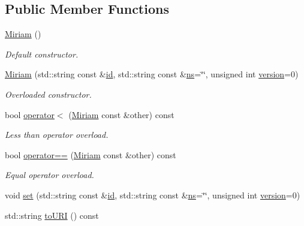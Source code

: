 \subsection*{Public Member Functions}
\begin{DoxyCompactItemize}
\item 
\hyperlink{classunisys_1_1Miriam_af805ea42b5093cb6f11f9c0e62bd448e}{Miriam} ()
\begin{DoxyCompactList}\small\item\em Default constructor. \end{DoxyCompactList}\item 
\hyperlink{classunisys_1_1Miriam_a1b881748690196866d48d3f221d20364}{Miriam} (std\-::string const \&\hyperlink{classunisys_1_1Miriam_a0f6c60a2c904d9e5b28653464f5867f1}{id}, std\-::string const \&\hyperlink{classunisys_1_1Miriam_a03b5f4f8523b5910504f6587fbd9cb0a}{ns}=\char`\"{}\char`\"{}, unsigned int \hyperlink{classunisys_1_1Miriam_a5dcb23fc55cc7643245087a941321a72}{version}=0)
\begin{DoxyCompactList}\small\item\em Overloaded constructor. \end{DoxyCompactList}\item 
bool \hyperlink{classunisys_1_1Miriam_a9c3ed7115b580c3f242b256a2e2a50b9}{operator$<$} (\hyperlink{classunisys_1_1Miriam}{Miriam} const \&other) const 
\begin{DoxyCompactList}\small\item\em Less than operator overload. \end{DoxyCompactList}\item 
bool \hyperlink{classunisys_1_1Miriam_af67d441a13cbe7ecc1d8898254f1709e}{operator==} (\hyperlink{classunisys_1_1Miriam}{Miriam} const \&other) const 
\begin{DoxyCompactList}\small\item\em Equal operator overload. \end{DoxyCompactList}\item 
void \hyperlink{classunisys_1_1Miriam_ade6975ff1e7ded3be3a2962acc8469fe}{set} (std\-::string const \&\hyperlink{classunisys_1_1Miriam_a0f6c60a2c904d9e5b28653464f5867f1}{id}, std\-::string const \&\hyperlink{classunisys_1_1Miriam_a03b5f4f8523b5910504f6587fbd9cb0a}{ns}=\char`\"{}\char`\"{}, unsigned int \hyperlink{classunisys_1_1Miriam_a5dcb23fc55cc7643245087a941321a72}{version}=0)
\item 
std\-::string \hyperlink{classunisys_1_1Miriam_ab08dc9375fadf0127c16024a93c9498f}{to\-U\-R\-I} () const 

\end{DoxyCompactItemize}
